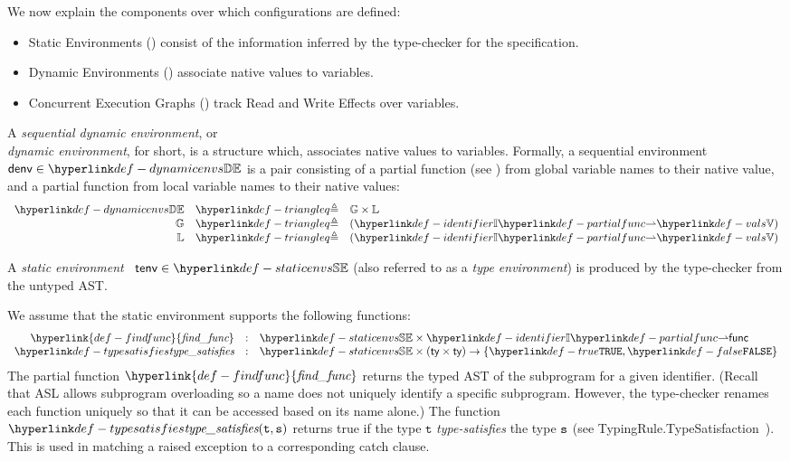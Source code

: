 \documentclass{book}
\newcommand\findfunc[0]{\hyperlink{def-findfunc}{\textfunc{find\_func}}}
\newcommand\vt[0]{\texttt{t}}
\begin{document}
We now explain the components over which configurations are defined:
\begin{itemize}
  \item Static Environments () consist of the information inferred
  by the type-checker for the specification.
  \item Dynamic Environments () associate native values to variables.
  \item Concurrent Execution Graphs () track Read and Write Effects over variables.
\end{itemize}
\newpage
\hypertarget{def-dynamicenvs}{}
\begin{definition}
A \emph{sequential dynamic environment}, or \\ \emph{dynamic environment}, for short, is a structure which,
associates native values to variables.
Formally, a sequential environment $\denv \in \dynamicenvs$ is a pair consisting of a partial function
(see ) from global
variable names to their native value, and a partial function from local variable names to their
native values:
\[
\begin{array}{rcl}
  \dynamicenvs          &\triangleq&  \mathbb{G} \times \mathbb{L} \\
  \mathbb{G}            &\triangleq&  (\Identifiers \partialto \vals) \\
  \mathbb{L}            &\triangleq&  (\Identifiers \partialto \vals) \\
\end{array}
\]
\end{definition}

\hypertarget{def-staticenvs}{}
\begin{definition}
A \emph{static environment}~\cite{ASLTypingReference} $\tenv \in \staticenvs$ (also referred to as a \emph{type environment})
is produced by the type-checker from the untyped AST.

We assume that the static environment supports the following functions:
\hypertarget{def-findfunc}{}
\hypertarget{def-typesatisfies}{}
\[
  \begin{array}{rcl}
    \findfunc       &:& \staticenvs \times \Identifiers \partialto \func\\
    \typesat  &:& \staticenvs \times (\ty \times \ty) \rightarrow \{\True, \False\}
  \end{array}
\]
The partial function $\findfunc$ returns the typed AST of the subprogram for a given identifier.
(Recall that ASL allows subprogram overloading so a name does not uniquely identify
a specific subprogram.
However, the type-checker renames each function uniquely so that it can be accessed based
on its name alone.)
%
The function $\typesat(\vt, \vs)$ returns true
if the type $\vt$ \emph{type-satisfies} the type $\texttt{s}$
(see TypingRule.TypeSatisfaction~\cite{ASLTypingReference}).
This is used in matching a raised exception to a corresponding catch clause.
\end{definition}
\end{document}
